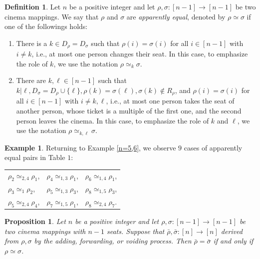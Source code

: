 \documentclass{amsart}
\newtheorem{proposition}[theorem]{Proposition}
\theoremstyle{definition}
\newtheorem{definition}[theorem]{Definition}
\newtheorem{example}[theorem]{Example}
\begin{document}
\begin{definition}
Let $n$ be a positive integer and let $\rho,\sigma:[n-1]\to[n-1]$ be two cinema mappings. We say that $\rho$ and $\sigma$ are \textit{apparently equal}, denoted by $\rho\simeq\sigma$ if one of the followings holds:
\begin{enumerate}
\item[i.] There is a $k\in D_{\rho}=D_{\sigma}$ such that $\rho(i)=\sigma(i)$ for all $i\in[n-1]$ with $i\neq k$, i.e., at most one person changes their seat. In this case, to emphasize the role of $k$, we use the notation $\rho\simeq_k\sigma$. 
\item[ii.] There are $k,\ell\in[n-1]$ such that $k|\ell, D_{\sigma}=D_{\rho}\cup\{\ell\}, \rho(k)=\sigma(\ell), \sigma(k)\notin R_{\rho}$, and $\rho(i)=\sigma(i)$ for all $i\in[n-1]$ with $i\neq k,\ell$, i.e., at most one person takes the seat of another person, whose ticket is a multiple of the first one, and the second person leaves the cinema. In this case, to emphasize the role of $k$ and $\ell$, we use the notation $\rho\simeq_{k,\ell}\sigma$. 
\end{enumerate} 
\end{definition}

\begin{example}\label{9pairs}
Returning to Example \ref{n=5,6}, we observe $9$ cases of apparently equal pairs in Table $1$:

\begin{center}
\begin{tabular}{ l l l }
$\rho_2\simeq_{2,4}\rho_1$, &$\rho_4\simeq_{1,3}\rho_1$, &$\rho_6\simeq_{1,4}\rho_1$, \\
$\rho_3\simeq_1\rho_2$, &$\rho_5\simeq_{1,3}\rho_3$, &$\rho_8\simeq_{1,5}\rho_3$, \\
$\rho_5\simeq_{2,4}\rho_4$, &$\rho_7\simeq_{1,5}\rho_1$, &$\rho_8\simeq_{2,4}\rho_7$.
\end{tabular}
\end{center}
\end{example}

\begin{proposition}
Let $n$ be a positive integer and let $\rho,\sigma:[n-1]\to[n-1]$ be two cinema mappings with $n-1$ seats. Suppose that $\bar{\rho},\bar{\sigma}:[n]\to[n]$ derived from $\rho,\sigma$ by the adding, forwarding, or voiding process. Then $\bar{\rho}=\bar{\sigma}$ if and only if $\rho\simeq\sigma$.
\end{proposition}
\end{document}
